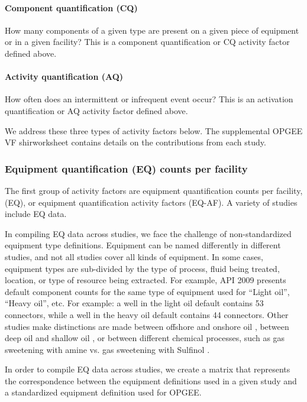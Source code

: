 \documentclass[11pt]{report}
\begin{document}
{{{{\paragraph{Component quantification (CQ)} How many components of a given type are present on a given piece of equipment or in a given facility? This is a component quantification or CQ activity factor defined above.

\paragraph{Activity quantification (AQ)} How often does an intermittent or infrequent event occur? This is an activation quantification or AQ activity factor defined above.

We address these three types of activity factors below. The supplemental OPGEE VF shirworksheet contains details on the contributions from each study.

\subsubsection{Equipment quantification (EQ) counts per facility}
The first group of activity factors are equipment quantification counts per facility, (EQ), or equipment quantification activity factors (EQ-AF). A variety of studies include EQ data. 

In compiling EQ data across studies, we face the challenge of non-standardized equipment type definitions.  Equipment can be named differently in different studies, and not all studies cover all kinds of equipment.  In some cases, equipment types are sub-divided by the type of process, fluid being treated, location, or type of resource being extracted. For example, API 2009 \cite[Appendix B]{Shires2009}presents default component counts for the same type of equipment used for ``Light oil'', ``Heavy oil'', etc.  For example: a well in the light oil default contains 53 connectors, while a well in the heavy oil default contains 44 connectors.  Other studies make distinctions are made between offshore and onshore oil \cite{API1993, Shires2009, EPA1996}, between deep oil and shallow oil \cite{CAPP2014}, or between different chemical processes, such as gas sweetening with amine vs. gas sweetening with Sulfinol \cite{CAPP2014}.

In order to compile EQ data across studies, we create a matrix that represents the correspondence between the equipment definitions used in a given study and a standardized equipment definition used for OPGEE.  

}}}}
\end{document}
